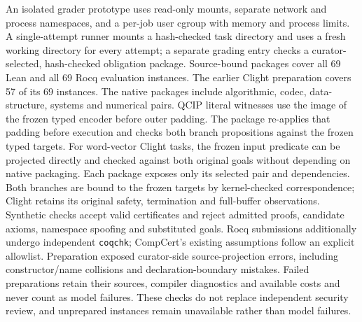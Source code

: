 \documentclass{article}
\begin{document}
An isolated grader prototype uses read-only mounts, separate network and process namespaces, and a per-job user cgroup with memory and process limits. A single-attempt runner mounts a hash-checked task directory and uses a fresh working directory for every attempt; a separate grading entry checks a curator-selected, hash-checked obligation package. Source-bound packages cover all 69 Lean and all 69 Rocq evaluation instances. The earlier Clight preparation covers 57 of its 69 instances. The native packages include algorithmic, codec, data-structure, systems and numerical pairs. QCIP literal witnesses use the image of the frozen typed encoder before outer padding. The package re-applies that padding before execution and checks both branch propositions against the frozen typed targets. For word-vector Clight tasks, the frozen input predicate can be projected directly and checked against both original goals without depending on native packaging. Each package exposes only its selected pair and dependencies. Both branches are bound to the frozen targets by kernel-checked correspondence; Clight retains its original safety, termination and full-buffer observations. Synthetic checks accept valid certificates and reject admitted proofs, candidate axioms, namespace spoofing and substituted goals. Rocq submissions additionally undergo independent \texttt{coqchk}; CompCert's existing assumptions follow an explicit allowlist. Preparation exposed curator-side source-projection errors, including constructor/name collisions and declaration-boundary mistakes. Failed preparations retain their sources, compiler diagnostics and available costs and never count as model failures. These checks do not replace independent security review, and unprepared instances remain unavailable rather than model failures.
\end{document}
